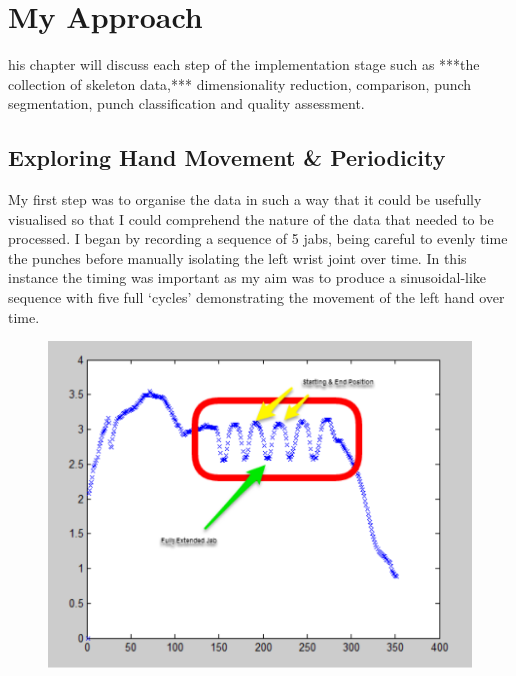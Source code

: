 %
%
\let\textcircled=\pgftextcircled
\chapter{My Approach}
\label{chap:intro}

his chapter will discuss each step of the implementation stage such as ***the collection of skeleton data,*** dimensionality reduction, comparison,  punch segmentation, punch classification and quality assessment.


\section{Exploring Hand Movement \& Periodicity}
My first step was to organise the data in such a way that it could be usefully visualised so that I could comprehend the nature of the data that needed to be processed. I began by recording a sequence of 5 jabs, being careful to evenly time the punches before manually isolating the left wrist joint over time. In this instance the timing was important as my aim was to produce a sinusoidal-like sequence with five full `cycles' demonstrating the movement of the left hand over time.

\begin{figure}[t]
    \centering
    \includegraphics[height=0.25\textheight]{fig04/lwrist.pdf}
\end{figure}

